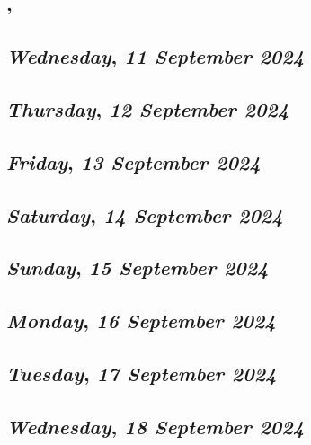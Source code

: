 \subsection*{\weekday, \day}

\def\day{\textit{11 September 2024}}
\def\weekday{\textit{Wednesday}}
\subsection*{\weekday, \day}

\def\day{\textit{12 September 2024}}
\def\weekday{\textit{Thursday}}
\subsection*{\weekday, \day}

\def\day{\textit{13 September 2024}}
\def\weekday{\textit{Friday}}
\subsection*{\weekday, \day}

\def\day{\textit{14 September 2024}}
\def\weekday{\textit{Saturday}}
\subsection*{\weekday, \day}

\def\day{\textit{15 September 2024}}
\def\weekday{\textit{Sunday}}
\subsection*{\weekday, \day}

\def\day{\textit{16 September 2024}}
\def\weekday{\textit{Monday}}
\subsection*{\weekday, \day}

\def\day{\textit{17 September 2024}}
\def\weekday{\textit{Tuesday}}
\subsection*{\weekday, \day}

\def\day{\textit{18 September 2024}}
\def\weekday{\textit{Wednesday}}
\subsection*{\weekday, \day}


